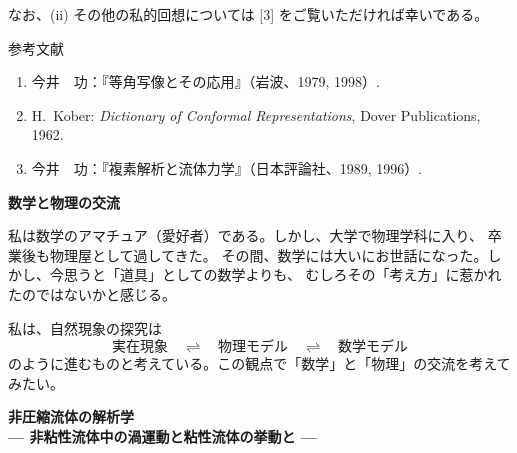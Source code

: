 \documentclass[uplatex,dvipdfmx]{jlreq}
\begin{document}
なお、(ii) その他の私的回想については [3] をご覧いただければ幸いである。

\vspace{6pt}

\begin{center}
  \textsc{参考文献}
\end{center}
\begin{enumerate}
  \item[{[1]}] 今井　功：『等角写像とその応用』（岩波、1979, 1998）.
  \item[{[2]}] H.~Kober: \textit{Dictionary of Conformal Representations},
               Dover Publications, 1962.
  \item[{[3]}] 今井　功：『複素解析と流体力学』（日本評論社、1989, 1996）.
\end{enumerate}

\newpage

\begin{center}
  {\Large\bfseries 数学と物理の交流}
\end{center}

\bigskip
\hspace*{\fill}{\large\bfseries 今井　功}

\bigskip

私は数学のアマチュア（愛好者）である。しかし、大学で物理学科に入り、
卒業後も物理屋として過してきた。
その間、数学には大いにお世話になった。しかし、今思うと「道具」としての数学よりも、
むしろその「考え方」に惹かれたのではないかと感じる。

私は、自然現象の探究は
\[
  \text{実在現象}
  \quad \rightleftharpoons \quad
  \text{物理モデル}
  \quad \rightleftharpoons \quad
  \text{数学モデル}
\]
のように進むものと考えている。この観点で「数学」と「物理」の交流を考えてみたい。

\newpage

\begin{center}
  {\Large\bfseries 非圧縮流体の解析学\\
  \normalsize --- 非粘性流体中の渦運動と粘性流体の挙動と ---}
\end{center}

\bigskip
\hspace*{\fill}{\large\bfseries 宮川　鉄朗（神戸大・理）}
\end{document}
